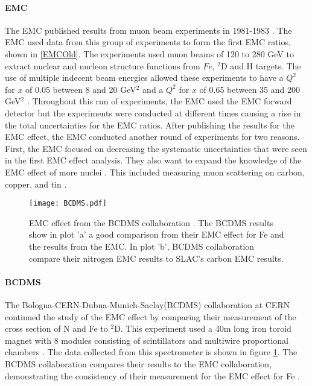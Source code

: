 \paragraph{EMC} The EMC published results from muon beam experiments in 1981-1983 \cite{EMC_iron,EM,EMC_F2d,CERN_EMC}.  The EMC used data from this group of experiments to form the first EMC ratios, shown in \ref{EMCOld}. The experiments used muon beams of 120 to 280 GeV to extract nuclear and nucleon structure functions from $Fe$, $^2$D and H targets. The use of multiple indecent beam energies allowed these experiments to have a $Q^2$ for $x$ of 0.05 between 8 and 20 GeV$^2$ and a $Q^2$ for $x$ of 0.65 between 35 and 200 GeV$^2$ \cite{CERN_EMC}. Throughout this run of experiments, the EMC used the EMC forward detector but the experiments were conducted at different times causing a rise in the total uncertainties for the EMC ratios\cite{EM}. After publishing the results for the EMC effect, the EMC conducted another round of experiments for two reasons. First, the EMC focused on decreasing the systematic uncertainties that were seen in the first EMC effect analysis. They also want to expand the knowledge of the EMC effect of more nuclei \cite{EMC_ext, Ajth}. This included measuring muon scattering on carbon, copper, and tin \cite{EMC_ext}.

\begin{figure}[t!]
	\centering
	\texttt{[image: BCDMS.pdf]}
		\caption{EMC effect from the BCDMS collaboration \cite{BCDMS}. The BCDMS results show in plot 'a' a good comparison from their EMC effect for Fe and the results from the EMC. In plot 'b', BCDMS collaboration compare their nitrogen EMC results to SLAC's carbon EMC results.}
	\label{fig:BCDMS}
\end{figure}
\paragraph{BCDMS}The Bologna-CERN-Dubna-Munich-Saclay(BCDMS) collaboration at CERN continued the study of the EMC effect by comparing their measurement of the cross section of N and Fe to $^2$D. This experiment used a 40m long iron toroid magnet with 8 modules consisting of scintillators and multiwire proportional chambers \cite{BCDMS}. The data collected from this spectrometer is shown in figure \ref{fig:BCDMS}. The BCDMS collaboration compares their results to the EMC collaboration, demonstrating the consistency of their measurement for the EMC effect for Fe \cite{BCDMS,Norton}.

